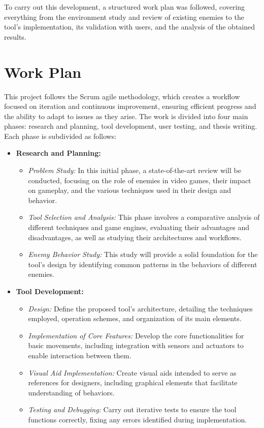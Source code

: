 To carry out this development, a structured work plan was followed, covering everything from the environment study and review of existing enemies to the tool’s implementation, its validation with users, and the analysis of the obtained results.

\section*{Work Plan}
This project follows the Scrum agile methodology, which creates a workflow focused on iteration and continuous improvement, ensuring efficient progress and the ability to adapt to issues as they arise. The work is divided into four main phases: research and planning, tool development, user testing, and thesis writing. Each phase is subdivided as follows:

\begin{itemize}
  \item \textbf{Research and Planning:}
    \begin{itemize}
      \item \emph{Problem Study:} In this initial phase, a state-of-the-art review will be conducted, focusing on the role of enemies in video games, their impact on gameplay, and the various techniques used in their design and behavior.
      \item \emph{Tool Selection and Analysis:} This phase involves a comparative analysis of different techniques and game engines, evaluating their advantages and disadvantages, as well as studying their architectures and workflows.
      \item \emph{Enemy Behavior Study:} This study will provide a solid foundation for the tool’s design by identifying common patterns in the behaviors of different enemies.
    \end{itemize}

  \item \textbf{Tool Development:}
    \begin{itemize}
      \item \emph{Design:} Define the proposed tool’s architecture, detailing the techniques employed, operation schemes, and organization of its main elements.
      \item \emph{Implementation of Core Features:} Develop the core functionalities for basic movements, including integration with sensors and actuators to enable interaction between them.
      \item \emph{Visual Aid Implementation:} Create visual aids intended to serve as references for designers, including graphical elements that facilitate understanding of behaviors.
      \item \emph{Testing and Debugging:} Carry out iterative tests to ensure the tool functions correctly, fixing any errors identified during implementation.
    \end{itemize}


\end{itemize}
